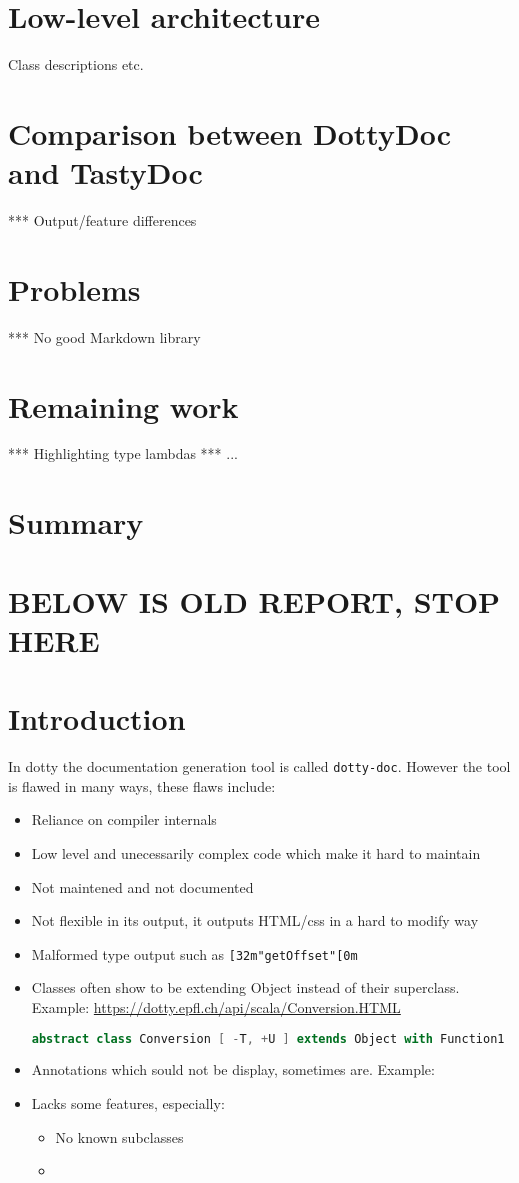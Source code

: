\documentclass{report}
\begin{document}
\chapter{Low-level architecture}
Class descriptions etc.

\chapter{Comparison between DottyDoc and TastyDoc}
*** Output/feature differences

\chapter{Problems}
*** No good Markdown library

\chapter{Remaining work}
*** Highlighting type lambdas
*** ...

\chapter{Summary}


\chapter{BELOW IS OLD REPORT, STOP HERE}

\chapter{Introduction}
In dotty the documentation generation tool is called \texttt{dotty-doc}. However the tool is flawed in many ways, these flaws include:
\begin{itemize}
    \item Reliance on compiler internals
    \item Low level and unecessarily complex code which make it hard to maintain
    \item Not maintened and not documented
    \item Not flexible in its output, it outputs HTML/css in a hard to modify way
    \item Malformed type output such as \texttt{[32m"getOffset"[0m}
    \item Classes often show to be extending Object instead of their superclass. Example: \url{https://dotty.epfl.ch/api/scala/Conversion.HTML}
\begin{lstlisting}[language=scala]
abstract class Conversion [ -T, +U ] extends Object with Function1
\end{lstlisting}
    \item Annotations which sould not be display, sometimes are. Example:
    \item Lacks some features, especially:
    \begin{itemize}
        \item No known subclasses
        \item 
    \end{itemize}
\end{itemize}
\end{document}
